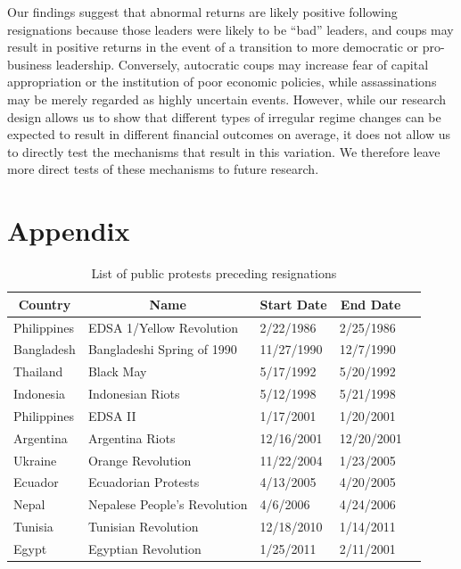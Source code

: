 \documentclass[12pt,final,fleqn]{article}
\theoremstyle{plain}
\begin{document}
Our findings suggest that abnormal returns are likely positive following resignations because those leaders were likely to be ``bad'' leaders, and coups may result in positive returns in the event of a transition to more democratic or pro-business leadership. Conversely, autocratic coups may increase fear of capital appropriation or the institution of poor economic policies, while assassinations may be merely regarded as highly uncertain events. However, while our research design allows us to show that different types of irregular regime changes can be expected to result in different financial outcomes on average, it does not allow us to directly test the mechanisms that result in this variation. We therefore leave more direct tests of these mechanisms to future research. 

\newpage

\appendix
\setcounter{table}{0}
\renewcommand\thetable{\Alph{section}.\arabic{table}}
\section{Appendix} \label{Appendix}
\begin{table}[!ht]
\caption{List of public protests preceding resignations} \label{tab:protest-list}
\vspace{-5pt}
\footnotesize
\begin{center}
\begin{threeparttable}
\begin{tabular*}{\textwidth}{l@{\extracolsep{\fill}}llll}
  \hline
    \hline
\multicolumn{1}{c}{Country}&\multicolumn{1}{c}{Name}&\multicolumn{1}{c}{Start Date}&\multicolumn{1}{c}{End Date}\\
  \hline
Philippines & EDSA 1/Yellow Revolution & 2/22/1986 & 2/25/1986\\
Bangladesh & Bangladeshi Spring of 1990 & 11/27/1990 & 12/7/1990\\
Thailand & Black May & 5/17/1992 & 5/20/1992\\
Indonesia & Indonesian Riots & 5/12/1998 & 5/21/1998\\
Philippines & EDSA II & 1/17/2001 & 1/20/2001\\
Argentina & Argentina Riots & 12/16/2001 & 12/20/2001\\
Ukraine & Orange Revolution & 11/22/2004 & 1/23/2005\\
Ecuador & Ecuadorian Protests & 4/13/2005 & 4/20/2005\\
Nepal & Nepalese People's Revolution & 4/6/2006 & 4/24/2006\\
Tunisia & Tunisian Revolution & 12/18/2010 & 1/14/2011\\
Egypt & Egyptian Revolution & 1/25/2011 & 2/11/2001\\
   \hline
   \hline
\end{tabular*}
\scriptsize
\end{threeparttable}
\end{center}
\end{table}
\end{document}
